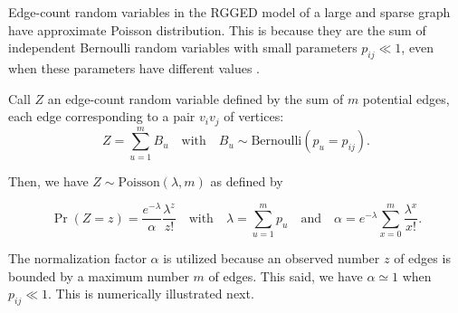 \documentclass{article}\usepackage[]{graphicx}\usepackage[]{xcolor}
\begin{document}
Edge-count random variables in the RGGED model of a large and sparse graph have approximate Poisson distribution. This is because they are the sum of independent Bernoulli random variables with small parameters $p_{ij} \ll 1$, even when these parameters have different values \cite{lecam1960approximation, kerstan1964verallgemeinerung, JCB}.

Call $Z$ an edge-count random variable defined by the sum of $m$ potential edges, each edge corresponding to a pair $v_iv_j$ of vertices:
\begin{equation}
Z = \sum_{u=1}^m B_u \quad \text{with} \quad B_u \sim \text{Bernoulli} \left(p_u = p_{ij} \right).
\end{equation}

Then, we have $Z \sim \text{Poisson} \left(\lambda, m\right)$ as defined by

\begin{equation}
\Pr \left( Z = z \right) = \frac{e^{-\lambda}}{\alpha}\frac{\lambda^z}{z!} \quad \text{with} \quad \lambda = \sum_{u=1}^m p_u \quad \text{and} \quad
\alpha = e^{-\lambda} \sum_{x=0}^m \frac{\lambda^x}{x!}.
\end{equation}

The normalization factor $\alpha$ is utilized because an observed number $z$ of edges is bounded by a maximum number $m$ of edges. This said, we have $\alpha \simeq 1$ when $p_{ij} \ll 1$. This is numerically illustrated next.
\end{document}
